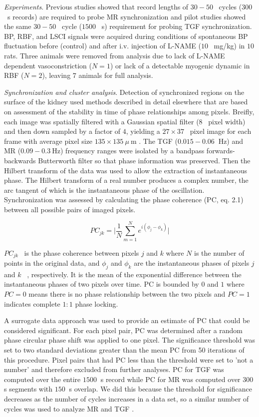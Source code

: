 	\emph{Experiments}. Previous studies showed that record lengths of $30-50$ \ cycles ($300$ \ s records) are required to probe MR synchronization \cite{Scully14} and pilot studies showed the same $30-50$ \ cycle ($1500$ \ s) requirement for probing TGF synchronization. BP, RBF, and LSCI signals were acquired during conditions of spontaneous BP fluctuation before (control) and after i.v. injection of L-NAME ($10$ \ mg/kg) in $10$ rats. Three animals were removed from analysis due to lack of L-NAME dependent vasoconstriction ($N = 1$) or lack of a detectable myogenic dynamic in RBF ($N=2$), leaving $7$ animals for full analysis. 
	
	\emph{Synchronization and cluster analysis}. Detection of synchronized regions on the surface of the kidney used methods described in detail elsewhere \cite{Scully14} that are based on assessment of the stability in time of phase relationships among pixels. Breifly, each image was spatially filtered with a Gaussian spatial filter ($8$ \ pixel width) and then down sampled by a factor of $4$, yielding a $27\times 37$ \ pixel image for each frame with average pixel size $135\times 135 \ \mu \ $m \cite{Scully14,Scully13}. The TGF ($0.015-0.06 \ $ Hz) and MR ($0.09-0.3 \ $Hz) frequency ranges were isolated by a bandpass forwards-backwards Butterworth filter so that phase information was preserved. Then the Hilbert transform of the data was used to allow the extraction of instantaneous phase. The Hilbert transform of a real number produces a complex number, the arc tangent of which is the instantaneous phase of the oscillation. Synchronization was assessed by calculating the phase coherence (PC, eq. 2.1) between all possible pairs of imaged pixels.

\begin{equation}	
PC_{jk} = \lvert \frac{1}{N} \sum \limits_{m=1}^{N} e ^{i(\phi_j - \phi_k)} \rvert
\end{equation}

	$PC_{jk}$ \ is the phase coherence between pixels $j$ and $k$ where $N$ is the number of points in the original data, and $\phi _{j}$ and $\phi _{k}$ are the instantaneous phases of pixels $j$ and $k$ \ , respectively. It is the mean of the exponential difference between the instantaneous phases of two pixels over time. PC is bounded by $0$ and $1$ where $PC=0$ means there is no phase relationship between the two pixels and $PC=1$ indicates complete $1:1$ phase locking.

	A surrogate data approach was used to provide an estimate of PC that could be considered significant. For each pixel pair, PC was determined after a random phase circular phase shift was applied to one pixel. The significance threshold was set to two standard deviations greater than the mean PC from 50 iterations of this procedure. Pixel pairs that had PC less than the threshold were set to 'not a number' and therefore excluded from further analyses. PC for TGF was computed over the entire $1500 \ $ s record while PC for MR was computed over $300 \ $ s segments with $150 \ $ s overlap. We did this because the threshold for significance decreases as the number of cycles increases in a data set, so a similar number of cycles was used to analyze MR and TGF \cite{Scully14}.
	
